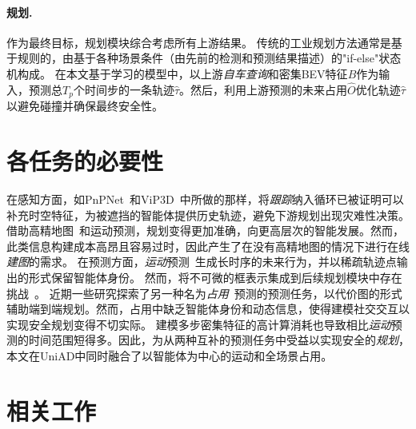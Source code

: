\documentclass[10pt,twocolumn,letterpaper]{article}
\begin{document}
\paragraph{规划.} 作为最终目标，规划模块综合考虑所有上游结果。
%
传统的工业规划方法通常是基于规则的，由基于各种场景条件（由先前的检测和预测结果描述）的"if-else"状态机构成。
%
在本文基于学习的模型中，以上游\textit{自车查询}和密集BEV特征$B$作为输入，预测总$T_{p}$个时间步的一条轨迹$\hat{\tau}$。然后，利用上游预测的未来占用$\hat{O}$优化轨迹$\hat{\tau}$以避免碰撞并确保最终安全性。

\section{各任务的必要性}
\label{sec:task-necessity}

在感知方面，如PnPNet~\cite{liang2020pnpnet}和ViP3D~\cite{gu2022vip3d}中所做的那样，将\textit{跟踪}纳入循环已被证明可以补充时空特征，为被遮挡的智能体提供历史轨迹，避免下游规划出现灾难性决策。
%
借助高精地图~\cite{zeng2019nmp,sadat2020p3,liang2020pnpnet,gu2022vip3d}和运动预测，规划变得更加准确，向更高层次的智能发展。然而，此类信息构建成本高昂且容易过时，因此产生了在没有高精地图的情况下进行在线\textit{建图}的需求。
%
在预测方面，\textit{运动}预测~\cite{casas2018intentnet, jia2021ide, jia2022temporal, gao2020vectornet, Zhao2020tnt}生成长时序的未来行为，并以稀疏轨迹点输出的形式保留智能体身份。
%
然而，将不可微的框表示集成到后续规划模块中存在挑战~\cite{gu2022vip3d, liang2020pnpnet}。
%
近期一些研究探索了另一种名为\textit{占用}~\cite{thrun1996occgrid}预测的预测任务，以代价图的形式辅助端到端规划。然而，占用中缺乏智能体身份和动态信息，使得建模社交交互以实现安全规划变得不切实际。
%
建模多步密集特征的高计算消耗也导致相比\textit{运动}预测的时间范围短得多。因此，为从两种互补的预测任务中受益以实现安全的\textit{规划}，本文在UniAD中同时融合了以智能体为中心的运动和全场景占用。 


\section{相关工作}
\label{sec:related-work}
\end{document}
